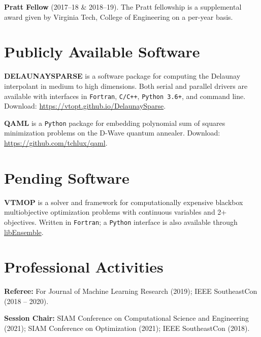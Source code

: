 \documentclass[12pt]{article}
\begin{document}
\textbf{Pratt Fellow} (2017--18 \& 2018--19).
The Pratt fellowship is a supplemental award given by
Virginia Tech, College of Engineering on a per-year basis.

\section*{Publicly Available Software}

\textbf{DELAUNAYSPARSE} is a software package for computing the Delaunay
interpolant in medium to high dimensions.
Both serial and parallel drivers are available with interfaces in
\texttt{Fortran},
\texttt{C/C++},
\texttt{Python 3.6+},
and command line.
Download: \url{https://vtopt.github.io/DelaunaySparse}.

\textbf{QAML} is a \texttt{Python} package for embedding polynomial sum of
squares minimization problems on the D-Wave quantum annealer.
Download: \url{https://github.com/tchlux/qaml}.

\section*{Pending Software}

\textbf{VTMOP} is a solver and framework for computationally
expensive blackbox multiobjective optimization problems with continuous
variables and 2+ objectives.
Written in \texttt{Fortran}; a \texttt{Python} interface is also available
through
\href{https://github.com/Libensemble/libensemble/blob/master/libensemble/gen_funcs/vtmop.py}{libEnsemble}.



\newpage
{}



\newpage
\section*{Professional Activities}

\textbf{Referee:} For
Journal of Machine Learning Research (2019);
IEEE SoutheastCon (2018 -- 2020).

\textbf{Session Chair:}
SIAM Conference on Computational Science and Engineering (2021);
SIAM Conference on Optimization (2021); IEEE SoutheastCon (2018).
\end{document}
